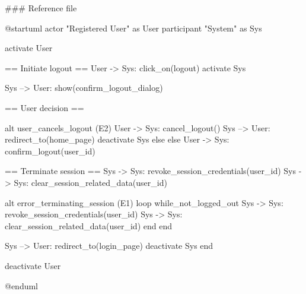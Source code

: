 ### Reference file


@startuml
actor "Registered User" as User
participant "System" as Sys

activate User

== Initiate logout ==
User -> Sys: click_on(logout)
activate Sys

Sys --> User: show(confirm_logout_dialog)

== User decision ==

alt user_cancels_logout (E2)
    User -> Sys: cancel_logout()
    Sys --> User: redirect_to(home_page)
    deactivate Sys
else else
    User -> Sys: confirm_logout(user_id)

    == Terminate session ==
    Sys -> Sys: revoke_session_credentials(user_id)
    Sys -> Sys: clear_session_related_data(user_id)

    alt error_terminating_session (E1)
        loop while_not_logged_out
           Sys -> Sys: revoke_session_credentials(user_id)
           Sys -> Sys: clear_session_related_data(user_id)
        end
    end

    Sys --> User: redirect_to(login_page)
    deactivate Sys
end

deactivate User

@enduml
